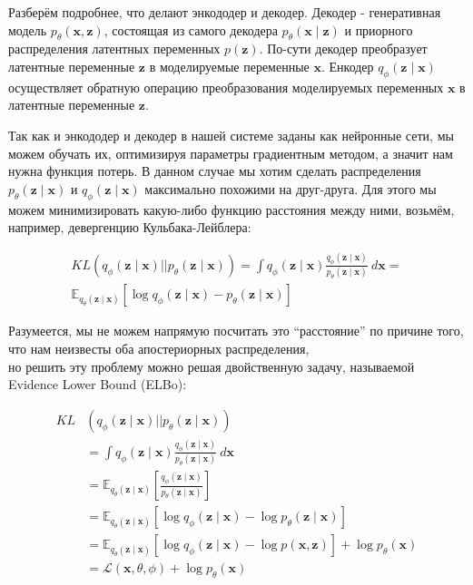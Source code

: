 \documentclass[a4paper]{report}
\begin{document}
Разберём подробнее, что делают энкододер и декодер. Декодер - генеративная модель $p_\theta(\mathbf{x}, \mathbf{z})$, состоящая из самого декодера
$p_\theta(\mathbf{x} \mid \mathbf{z})$ и приорного распределения латентных переменных $p(\mathbf{z})$. По-сути декодер преобразует латентные переменные
$\mathbf{z}$ в моделируемые переменные $\mathbf{x}$. Енкодер $q_\phi(\mathbf{z} \mid \mathbf{x})$ осуществляет обратную операцию преобразования моделируемых
переменных $\mathbf{x}$ в латентные переменные $\mathbf{z}$.

Так как и энкододер и декодер в нашей системе заданы как нейронные сети, мы можем обучать их, оптимизируя параметры градиентным методом, а
значит нам нужна функция потерь. В данном случае мы хотим сделать распределения $p_\theta(\mathbf{z} \mid \mathbf{x})$ и $q_\phi(\mathbf{z} \mid \mathbf{x})$
максимально похожими на друг-друга. Для этого мы можем минимизировать какую-либо функцию расстояния между ними, возьмём, например, девергенцию
Кульбака-Лейблера:

\begin{gather*}
    KL(q_\phi(\mathbf{z} \mid \mathbf{x}) || p_\theta(\mathbf{z} \mid \mathbf{x})) 
    = \int q_\phi(\mathbf{z} \mid \mathbf{x}) \frac{q_\phi(\mathbf{z} \mid \mathbf{x})}{p_\theta(\mathbf{z} \mid \mathbf{x})}~d\mathbf{x} =\\
    \mathbb{E}_{q_\theta(\mathbf{z} \mid \mathbf{x})} \left[\log q_\phi(\mathbf{z} \mid \mathbf{x}) - p_\theta(\mathbf{z} \mid \mathbf{x})\right]
\end{gather*}

Разумеется, мы не можем напрямую посчитать это ``расстояние'' по причине того, что нам неизвесты оба апостериорных распределения, \\
но решить эту проблему можно решая двойственную задачу, называемой Evidence Lower Bound (ELBo):

\begin{align*}
     KL&(q_\phi(\mathbf{z} \mid \mathbf{x}) || p_\theta(\mathbf{z} \mid \mathbf{x})) \\
    &= \int q_\phi(\mathbf{z} \mid \mathbf{x}) \frac{q_\phi(\mathbf{z} \mid \mathbf{x})}{p_\theta(\mathbf{z} \mid \mathbf{x})}~d\mathbf{x}\\
    &= \mathbb{E}_{q_\theta(\mathbf{z} \mid \mathbf{x})} \left[\frac{q_\phi(\mathbf{z} \mid \mathbf{x})}{p_\theta(\mathbf{z} \mid \mathbf{x})}\right]\\
    &= \mathbb{E}_{q_\theta(\mathbf{z} \mid \mathbf{x})} \left[\log q_\phi(\mathbf{z} \mid \mathbf{x}) - \log p_\theta(\mathbf{z} \mid \mathbf{x})\right]\\
    &= \mathbb{E}_{q_\theta(\mathbf{z} \mid \mathbf{x})} \left[\log q_\phi(\mathbf{z} \mid \mathbf{x}) - \log p(\mathbf{x}, \mathbf{z})\right] + \log p_\theta(\mathbf{x})\\
    &= \mathcal{L}(\mathbf{x}, \theta, \phi) + \log p_\theta(\mathbf{x})
\end{align*}
\end{document}
